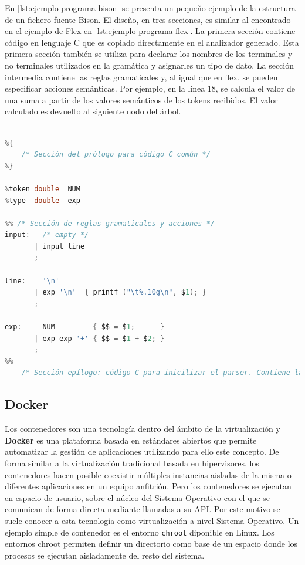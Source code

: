 

En \ref{lst:ejemplo-programa-bison} se presenta un pequeño ejemplo de la estructura de un fichero fuente Bison. El diseño, en tres secciones, es similar al encontrado en el ejemplo de Flex en \ref{lst:ejemplo-programa-flex}. La primera sección contiene código en lenguaje C que es copiado directamente en el analizador generado. Esta primera sección también se utiliza para declarar los nombres de los terminales y no terminales utilizados en la gramática y asignarles un tipo de dato. La sección intermedia contiene las reglas gramaticales y, al igual que en flex, se pueden especificar acciones semánticas. Por ejemplo, en la línea 18, se calcula el valor de una suma a partir de los valores semánticos de los tokens recibidos. El valor calculado es devuelto al siguiente nodo del árbol.

\begin{lstlisting}[language=C,caption={Ejemplo de programa Bison \cite{mit_web_bisonExample}},label=lst:ejemplo-programa-bison]

%{
    /* Sección del prólogo para código C común */
%}

%token double  NUM
%type  double  exp

%% /* Sección de reglas gramaticales y acciones */
input:   /* empty */
       | input line
       ;

line:    '\n'
       | exp '\n'  { printf ("\t%.10g\n", $1); }
       ;
    
exp:     NUM         { $$ = $1;      }
       | exp exp '+' { $$ = $1 + $2; }
       ;
%%
    /* Sección epílogo: código C para inicilizar el parser. Contiene la función main() */
\end{lstlisting}

\subsection{Docker}

Los contenedores son una tecnología dentro del ámbito de la virtualización y \textbf{Docker} es una plataforma basada en estándares abiertos que permite automatizar la gestión de aplicaciones utilizando para ello este concepto. De forma similar a la virtualización tradicional basada en \gls{hipervisores}, los contenedores hacen posible coexistir múltiples instancias aisladas de la misma o diferentes aplicaciones en un  equipo anfitrión. Pero los contenedores se ejecutan en espacio de usuario, sobre el núcleo del Sistema Operativo con el que se comunican de forma directa mediante llamadas a su API. Por este motivo se suele conocer a esta tecnología como virtualización a nivel Sistema Operativo. Un ejemplo simple de contenedor es el entorno \verb|chroot| diponible en Linux. Los entornos chroot permiten definir un directorio como base de un espacio donde los procesos se ejecutan aisladamente del resto del sistema. 

